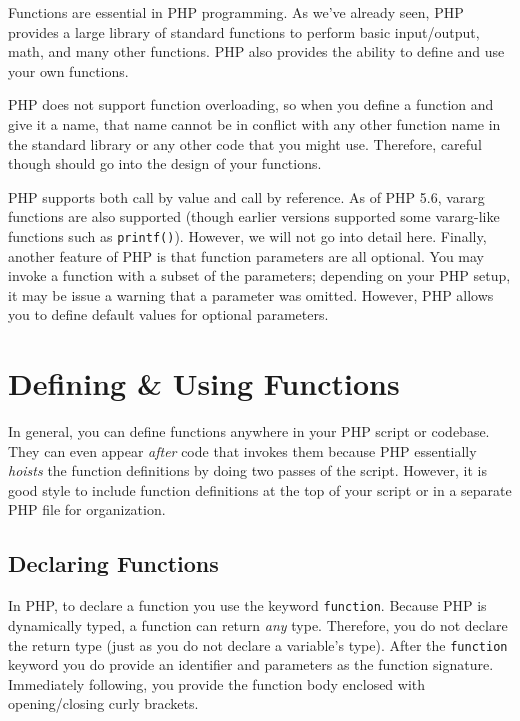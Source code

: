 

Functions are essential in PHP programming.  As we've 
already seen, PHP provides a large library of standard 
functions to perform basic input/output, math, and many 
other functions.  PHP also provides the ability to define 
and use your own functions.

PHP does not support function overloading, so when you
define a function and give it a name, that name cannot be
in conflict with any other function name in the standard library
or any other code that you might use.  Therefore, careful 
though should go into the design of your functions.  

PHP supports both call by value and call by reference.
As of PHP 5.6, vararg functions are also supported (though
earlier versions supported some vararg-like functions 
such as \texttt{printf()}).  However, we will not
go into detail here.  Finally, another feature of PHP is that
function parameters are all optional.  You may invoke
a function with a subset of the parameters; depending on
your PHP setup, it may be issue a warning that a parameter
was omitted.  However, PHP allows you to define default 
values for optional parameters.

 \section{Defining \& Using Functions}

In general, you can define functions anywhere in your PHP script
or codebase.  They can even appear \emph{after} code that
invokes them because PHP essentially \emph{hoists} the function
definitions by doing two passes of the script.  However, it is good
style to include function definitions at the top of your script or
in a separate PHP file for organization.

\subsection{Declaring Functions}

In PHP, to declare a function you use the keyword 
\texttt{function}.  Because PHP is dynamically typed, 
a function can return \emph{any} type.  Therefore, you do
not declare the return type (just as you do not declare a variable's
type).  After the \texttt{function} keyword you do
provide an identifier and parameters as the function signature.
Immediately following, you provide the function body enclosed
with opening/closing curly brackets.  

